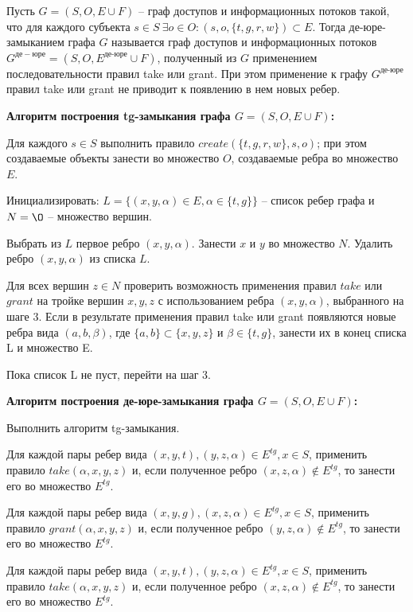 \begin{defs}
	Пусть $G = (S, O, E \cup F)$ -- граф доступов и информационных потоков такой, что для каждого субъекта
	$s \in S \ \exists o \in O : (s,o,\{t,g,r,w\}) \subset E$. Тогда де-юре-замыканием
	графа $G$ называется граф доступов и информационных потоков $G^{де-юре} = (S, O, E^{\text{де-юре}} \cup F)$, полученный
	из $G$ применением последовательности правил take или grant. При этом применение к графу $G^{\text{де-юре}}$ правил
	take или grant не приводит к появлению в нем новых ребер.
\end{defs}

\textbf{Алгоритм построения tg-замыкания графа $G = (S,O,E \cup F)$:}
\begin{enumerate*}
	\item Для каждого $s \in S$ выполнить правило $create(\{t,g,r,w\}, s,o)$;
	при этом создаваемые объекты занести во множество $O$, создаваемые ребра во множество $E$.
	\item Инициализировать: $L = \{(x,y,\alpha) \in E, \alpha \in \{t,g\}\}$ -- список ребер
	графа и $N = \O$ -- множество вершин.
	\item Выбрать из $L$ первое ребро $(x,y,\alpha)$. Занести $x$ и $y$ во множество $N$.
	Удалить ребро $(x,y,\alpha)$ из списка $L$.
	\item Для всех вершин $z \in N$ проверить возможность применения правил $take$ или $grant$
	на тройке вершин $x,y,z$ с использованием ребра $(x,y,\alpha)$, выбранного на шаге 3.
	Если в результате применения правил take или grant появляются новые ребра вида $(a,b,\beta)$,
	где $\{a,b\} \subset \{x,y,z\}$ и $\beta \in \{t,g\}$, занести их в конец списка L и
	множество E.
	\item Пока список L не пуст, перейти на шаг 3.
\end{enumerate*}

\textbf{Алгоритм построения де-юре-замыкания графа $G = (S,O,E \cup F)$:}
\begin{enumerate*}
	\item Выполнить алгоритм tg-замыкания.
	\item Для каждой пары ребер вида $(x,y,t),(y,z,\alpha) \in E^{tg}, x \in S$, применить правило
	$take(\alpha, x, y, z)$ и, если полученное ребро $(x,z,\alpha) \notin E^{tg}$, то занести
	его во множество $E^{tg}$.
	\item Для каждой пары ребер вида $(x,y,g),(x,z,\alpha) \in E^{tg}, x \in S$, применить правило
	$grant(\alpha, x, y, z)$ и, если полученное ребро $(y,z,\alpha) \notin E^{tg}$, то занести
	его во множество $E^{tg}$.
	\item Для каждой пары ребер вида $(x,y,t),(y,z,\alpha) \in E^{tg}, x \in S$, применить правило
	$take(\alpha, x, y, z)$ и, если полученное ребро $(x,z,\alpha) \notin E^{tg}$, то занести
	его во множество $E^{tg}$.
\end{enumerate*}

